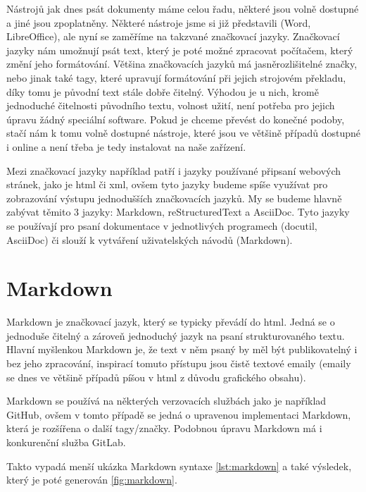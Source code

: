 Nástrojů jak dnes psát dokumenty máme celou řadu, některé jsou volně dostupné a jiné jsou zpoplatněny. Některé nástroje jsme si již představili (Word, LibreOffice), ale
nyní se zaměříme na takzvané značkovací jazyky. Značkovací jazyky nám umožnují psát text, který je poté možné zpracovat počítačem, který změní jeho formátování. Většina
značkovacích jazyků má jasně\linebreak rozlišitelné značky, nebo jinak také tagy, které upravují formátování při jejich strojovém překladu, díky tomu je původní text stále dobře čitelný.
\cite{markup} Výhodou je u nich, kromě jednoduché čitelnosti původního textu, volnost užití, není potřeba pro jejich úpravu žádný speciální software. Pokud je chceme převést do
konečné podoby, stačí nám k tomu volně dostupné nástroje, které jsou ve většině případů dostupné i online a není třeba je tedy instalovat na naše zařízení.

Mezi značkovací jazyky například patří i jazyky používané při\linebreak psaní webových stránek, jako je \gls{html} či \gls{xml}, ovšem tyto jazyky budeme spíše využívat pro zobrazování výstupu
jednodušších značkovacích jazyků. My se budeme hlavně zabývat těmito 3 jazyky: Markdown, reStructuredText a AsciiDoc. Tyto jazyky se používají pro psaní dokumentace v jednotlivých programech
(docutil, AsciiDoc) či slouží k vytváření uživatelských návodů (Markdown).
\clearpage

\section{Markdown}

Markdown je značkovací jazyk, který se typicky převádí do \gls{html}. Jedná se o jednoduše čitelný a zároveň jednoduchý jazyk na psaní strukturovaného textu. Hlavní myšlenkou Markdown je, že
text v něm psaný by měl být publikovatelný i bez jeho zpracování, inspirací tomuto přístupu jsou čistě textové emaily (emaily se dnes ve většině případů píšou v \gls{html}
z důvodu grafického obsahu). \cite{markdown}

Markdown se používá na některých verzovacích službách jako je například GitHub, ovšem v tomto případě se jedná o upravenou implementaci Markdown, která je rozšířena o další
tagy/značky. Podobnou úpravu Markdown má i konkurenční služba GitLab.

Takto vypadá menší ukázka Markdown syntaxe \ref{lst:markdown} a také výsledek, který je poté generován \ref{fig:markdown}.

